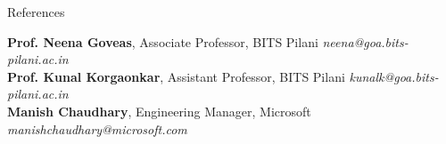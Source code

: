 
\begin{rSection}{References}

    \textbf{Prof. Neena Goveas}, Associate Professor, BITS Pilani \hfill \textit{neena@goa.bits-pilani.ac.in} \\
    \textbf{Prof. Kunal Korgaonkar}, Assistant Professor, BITS Pilani \hfill \textit{kunalk@goa.bits-pilani.ac.in} \\
    \textbf{Manish Chaudhary}, Engineering Manager, Microsoft \hfill \textit{manishchaudhary@microsoft.com}

\end{rSection}